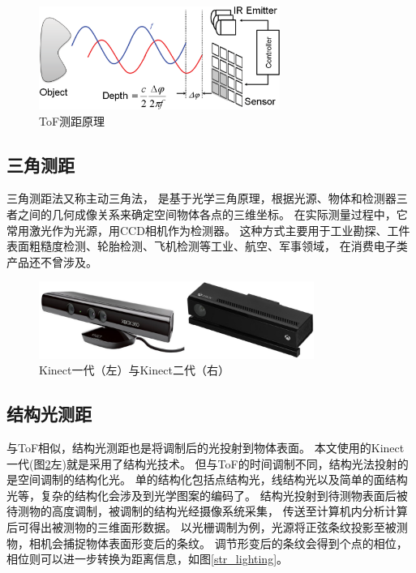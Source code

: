 \begin{figure}[h]
    \centering
    \includegraphics[width = 0.7\textwidth]{./Pictures/TOF.eps}
    \caption{ToF测距原理}
    \label{tof}
\end{figure}

\subsection{三角测距}

三角测距法又称主动三角法，
是基于光学三角原理，根据光源、物体和检测器三者之间的几何成像关系来确定空间物体各点的三维坐标。
在实际测量过程中，它常用激光作为光源，用CCD相机作为检测器。
这种方式主要用于工业勘探、工件表面粗糙度检测、轮胎检测、飞机检测等工业、航空、军事领域，
在消费电子类产品还不曾涉及。

\begin{figure}[h]
    \centering
    \includegraphics[width = 0.8\textwidth]{./Pictures/kinect_v1_v2.eps}
    \caption{Kinect一代（左）与Kinect二代（右）}
    \label{kinect_v1_v2}
\end{figure}
\subsection{结构光测距}
与ToF相似，结构光测距也是将调制后的光投射到物体表面。
本文使用的Kinect一代(图\ref{kinect_v1_v2}左)就是采用了结构光技术。
但与ToF的时间调制不同，结构光法投射的是空间调制的结构化光。
单的结构化包括点结构光，线结构光以及简单的面结构光等，复杂的结构化会涉及到光学图案的编码了。
结构光投射到待测物表面后被待测物的高度调制，被调制的结构光经摄像系统采集，
传送至计算机内分析计算后可得出被测物的三维面形数据。
以光栅调制为例，光源将正弦条纹投影至被测物，相机会捕捉物体表面形变后的条纹。
调节形变后的条纹会得到个点的相位，相位则可以进一步转换为距离信息，如图\ref{str_lighting}。


